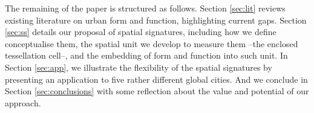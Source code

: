 The remaining of the paper is structured as follows. Section \ref{sec:lit}
reviews existing literature on urban form and function, highlighting current
gaps. Section \ref{sec:ss} details our proposal of spatial signatures,
including how we define conceptualise them, the spatial unit we develop to
measure them --the enclosed tessellation cell--, and the embedding of form and
function into such unit. In Section \ref{sec:app}, we illustrate the
flexibility of the spatial signatures by presenting an application to five
rather different global cities. And we conclude in Section
\ref{sec:conclusions} with some reflection about the value and potential of
our approach.








